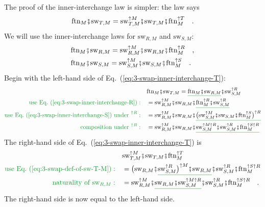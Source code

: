 The proof of the inner-interchange law is simpler: the law says
\begin{equation}
\text{ftn}_{M}\bef\text{sw}_{T,M}=\text{sw}_{T,M}^{\uparrow M}\bef\text{sw}_{T,M}\bef\text{ftn}_{M}^{\uparrow T}\quad.\label{eq:3-swap-inner-interchange-T}
\end{equation}
We will use the inner-interchange laws for $\text{sw}_{R,M}$ and
$\text{sw}_{S,M}$:
\begin{align}
 & \text{ftn}_{M}\bef\text{sw}_{R,M}=\text{sw}_{R,M}^{\uparrow M}\bef\text{sw}_{R,M}\bef\text{ftn}_{M}^{\uparrow R}\quad,\label{eq:3-swap-inner-interchange-R}\\
 & \text{ftn}_{M}\bef\text{sw}_{S,M}=\text{sw}_{S,M}^{\uparrow M}\bef\text{sw}_{S,M}\bef\text{ftn}_{M}^{\uparrow S}\quad.\label{eq:3-swap-inner-interchange-S}
\end{align}
Begin with the left-hand side of Eq.~(\ref{eq:3-swap-inner-interchange-T}):
\begin{align*}
 & \text{ftn}_{M}\bef\text{sw}_{T,M}=\gunderline{\text{ftn}_{M}\bef\text{sw}_{R,M}}\bef\text{sw}_{S,M}^{\uparrow R}\\
{\color{greenunder}\text{use Eq.~(\ref{eq:3-swap-inner-interchange-R})}:}\quad & =\text{sw}_{R,M}^{\uparrow M}\bef\text{sw}_{R,M}\bef\gunderline{\text{ftn}_{M}^{\uparrow R}\bef\text{sw}_{S,M}^{\uparrow R}}\\
{\color{greenunder}\text{use Eq.~(\ref{eq:3-swap-inner-interchange-S}) under }^{\uparrow R}:}\quad & =\text{sw}_{R,M}^{\uparrow M}\bef\text{sw}_{R,M}\bef\gunderline{\big(\text{sw}_{S,M}^{\uparrow M}\bef\text{sw}_{S,M}\bef\text{ftn}_{M}^{\uparrow S}\big)^{\uparrow R}}\\
{\color{greenunder}\text{composition under }^{\uparrow R}:}\quad & =\text{sw}_{R,M}^{\uparrow M}\bef\text{sw}_{R,M}\bef\gunderline{\text{sw}_{S,M}^{\uparrow M\uparrow R}\bef\text{sw}_{S,M}^{\uparrow R}\bef\text{ftn}_{M}^{\uparrow S\uparrow R}}
\end{align*}
The right-hand side of Eq.~(\ref{eq:3-swap-inner-interchange-T})
is 
\begin{align*}
 & \text{sw}_{T,M}^{\uparrow M}\bef\text{sw}_{T,M}\bef\text{ftn}_{M}^{\uparrow T}\\
{\color{greenunder}\text{use Eq.~(\ref{eq:3-swap-def-of-sw-T-M})}:}\quad & =\big(\text{sw}_{R,M}\bef\gunderline{\text{sw}_{S,M}^{\uparrow R}\big)^{\uparrow M}\bef\text{sw}_{R,M}}\bef\text{sw}_{S,M}^{\uparrow R}\bef\text{ftn}_{M}^{\uparrow S\uparrow R}\\
{\color{greenunder}\text{naturality of }\text{sw}_{R,M}:}\quad & =\text{sw}_{R,M}^{\uparrow M}\bef\gunderline{\text{sw}_{R,M}\bef\text{sw}_{S,M}^{\uparrow M\uparrow R}}\bef\text{sw}_{S,M}^{\uparrow R}\bef\text{ftn}_{M}^{\uparrow S\uparrow R}\quad.
\end{align*}
The right-hand side is now equal to the left-hand side.


